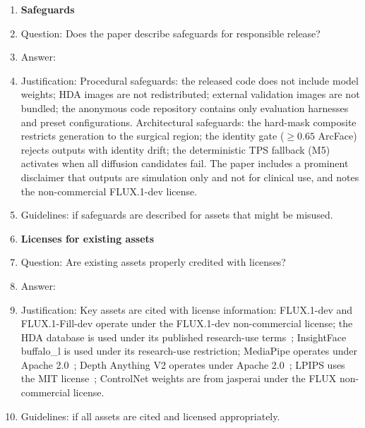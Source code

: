 \begin{enumerate}
\item {\bf Safeguards}
    \item[] Question: Does the paper describe safeguards for responsible release?
    \item[] Answer: \answerYes{}
    \item[] Justification: Procedural safeguards: the released code does not include model weights; HDA images are not redistributed; external validation images are not bundled; the anonymous code repository contains only evaluation harnesses and preset configurations. Architectural safeguards: the hard-mask composite restricts generation to the surgical region; the identity gate ($\geq 0.65$ ArcFace) rejects outputs with identity drift; the deterministic TPS fallback (M5) activates when all diffusion candidates fail. The paper includes a prominent disclaimer that outputs are simulation only and not for clinical use, and notes the non-commercial FLUX.1-dev license.
    \item[] Guidelines: \answerYes{} if safeguards are described for assets that might be misused.

\item {\bf Licenses for existing assets}
    \item[] Question: Are existing assets properly credited with licenses?
    \item[] Answer: \answerYes{}
    \item[] Justification: Key assets are cited with license information: FLUX.1-dev and FLUX.1-Fill-dev operate under the FLUX.1-dev non-commercial license; the HDA database is used under its published research-use terms~\citep{rathgeb2020plastic}; InsightFace buffalo\_l is used under its research-use restriction; MediaPipe operates under Apache 2.0~\citep{kartynnik2019mediapipe}; Depth Anything V2 operates under Apache 2.0~\citep{yang2024depth}; LPIPS uses the MIT license~\citep{zhang2018lpips}; ControlNet weights are from jasperai under the FLUX non-commercial license.
    \item[] Guidelines: \answerYes{} if all assets are cited and licensed appropriately.


\end{enumerate}
